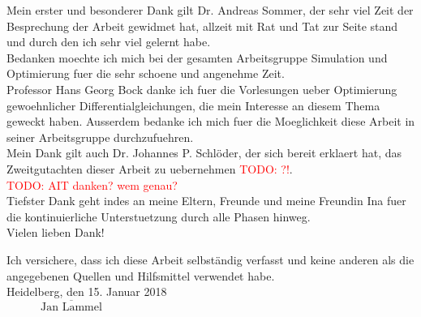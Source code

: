 \documentclass{scrartcl}[12pt, halfparskip]
\numberwithin{equation}{section}
\numberwithin{figure}{section}
\numberwithin{table}{section}
\newcommand{\todo}[1]{\textcolor{red}{TODO: #1}}
\begin{document}
\newpage
{}

Mein erster und besonderer Dank gilt Dr. Andreas Sommer, der sehr viel Zeit der Besprechung der Arbeit gewidmet hat, allzeit mit Rat und Tat zur Seite stand und durch den ich sehr viel gelernt habe.\\

Bedanken moechte ich mich bei der gesamten Arbeitsgruppe Simulation und Optimierung fuer die sehr schoene und angenehme Zeit. \\

Professor Hans Georg Bock danke ich fuer die Vorlesungen ueber Optimierung gewoehnlicher Differentialgleichungen, die mein Interesse an diesem Thema geweckt haben. Ausserdem bedanke ich mich fuer die Moeglichkeit diese Arbeit in seiner Arbeitsgruppe durchzufuehren. \\

Mein Dank gilt auch Dr. Johannes P. Schlöder, der sich bereit erklaert hat, das Zweitgutachten dieser Arbeit zu uebernehmen \todo{?!}. \\  

\todo{AIT danken? wem genau?} \\


Tiefster Dank geht indes an meine Eltern, Freunde und meine Freundin Ina fuer die kontinuierliche Unterstuetzung durch alle Phasen hinweg. \\

Vielen lieben Dank!


\newpage
{}
Ich versichere, dass ich diese Arbeit selbständig verfasst und keine anderen als die angegebenen Quellen und Hilfsmittel verwendet habe.\\[2ex]

Heidelberg, den 15. Januar 2018 \\[6ex]

$\overline{\qquad \quad \text{Jan Lammel} \quad \qquad}$
\end{document}
